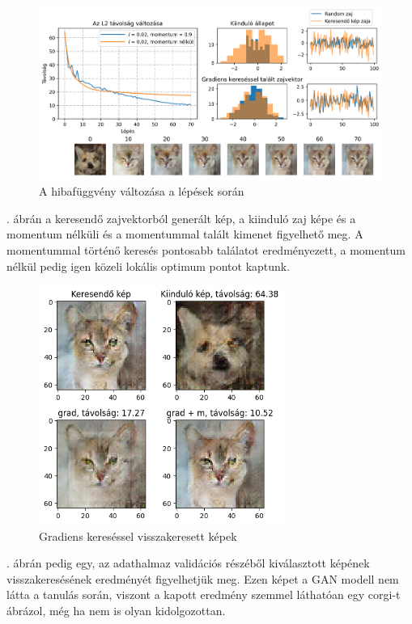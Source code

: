 \begin{figure}[h]
\centering
\includegraphics[width=15cm]{images/grad_losses.png}
\caption{A hibafüggvény változása a lépések során}
\label{fig:gradlosses}
\end{figure}

. ábrán a keresendő zajvektorból generált kép, a kiinduló zaj képe és a momentum nélküli és a momentummal talált kimenet figyelhető meg. A momentummal történő keresés pontosabb találatot eredményezett, a momentum nélkül pedig igen közeli lokális optimum pontot kaptunk.

\begin{figure}[h]
\centering
\includegraphics[width=8cm]{images/grad_found.png}
\caption{Gradiens kereséssel visszakeresett képek}
\label{fig:gradfound}
\end{figure}

. ábrán pedig egy, az adathalmaz validációs részéből kiválasztott képének visszakeresésének eredményét figyelhetjük meg. Ezen képet a GAN modell nem látta a tanulás során, viszont a kapott eredmény szemmel láthatóan egy corgi-t ábrázol, még ha nem is olyan kidolgozottan.

